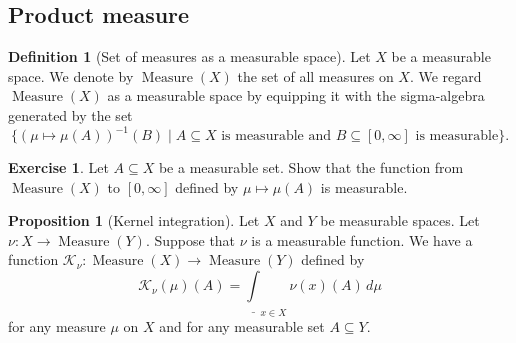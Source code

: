 \documentclass{article}
\theoremstyle{definition}
\newtheorem{proposition}[theorem]{Proposition}
\newtheorem{definition}[theorem]{Definition}
\newtheorem{exercise}[theorem]{Exercise}
\DeclareMathOperator{\Measure}{Measure}
\begin{document}

\subsection{Product measure}

\begin{definition}[Set of measures as a measurable space]
  Let $X$ be a measurable space.
  We denote by $\Measure(X)$ the set of all measures on $X$.
  We regard $\Measure(X)$ as a measurable space 
  by equipping it with the sigma-algebra generated by the set
  \begin{equation*}
    \{ (\mu \mapsto \mu (A))^{-1} (B) 
      \mid \text{$A \subseteq X$ is measurable and $B \subseteq [0, \infty]$ is measurable} \}.
  \end{equation*}
\end{definition}

\begin{exercise}
  Let $A \subseteq X$ be a measurable set.
  Show that
  the function from $\Measure (X)$ to $[0, \infty]$
  defined by $\mu \mapsto \mu (A)$ is measurable.
\end{exercise}

\begin{proposition}[Kernel integration]
  Let $X$ and $Y$ be measurable spaces.
  Let $\nu : X \to \Measure (Y)$. 
  Suppose that $\nu$ is a measurable function.
  We have a function 
  $\mathcal{K}_\nu : \Measure (X) \to \Measure (Y)$ defined by
  \begin{equation*}
    \mathcal{K}_\nu (\mu) (A) 
      = \underline{\int}_{x \in X} \nu(x) (A) \, d\mu
  \end{equation*}
  for any measure $\mu$ on $X$ and for any measurable set $A \subseteq Y$.
\end{proposition}

\end{document}
